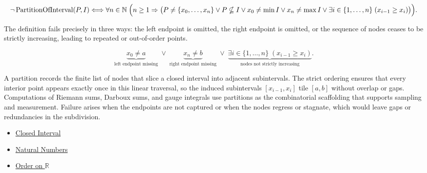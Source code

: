 \begin{remark*}
\[
\neg\operatorname{PartitionOfInterval}(P,I) \Longleftrightarrow
\forall n\in\mathbb{N}\;\Bigl(n\ge 1 \Rightarrow
\bigl(P\ne\{x_0,\ldots,x_n\}\lor P\nsubseteq I
\lor x_0\ne\min I \lor x_n\ne\max I
\lor \exists i\in\{1,\ldots,n\}\;(x_{i-1}\ge x_i)\bigr)\Bigr).
\]
\end{remark*}

\begin{remark*}
The definition fails precisely in three ways: the left endpoint is omitted, the right endpoint is omitted, or the sequence of nodes ceases to be strictly increasing, leading to repeated or out-of-order points.
\end{remark*}

\begin{remark*}
\[
\underbrace{x_0\ne a}_{\text{left endpoint missing}}
\;\lor\;
\underbrace{x_n\ne b}_{\text{right endpoint missing}}
\;\lor\;
\underbrace{\exists i\in\{1,\ldots,n\}\;(x_{i-1}\ge x_i)}_{\text{nodes not strictly increasing}}.
\]
\end{remark*}

\begin{remark*}[Interpretation]
A partition records the finite list of nodes that slice a closed interval into adjacent subintervals. The strict ordering ensures that every interior point appears exactly once in this linear traversal, so the induced subintervals $[x_{i-1},x_i]$ tile $[a,b]$ without overlap or gaps. Computations of Riemann sums, Darboux sums, and gauge integrals use partitions as the combinatorial scaffolding that supports sampling and measurement. Failure arises when the endpoints are not captured or when the nodes regress or stagnate, which would leave gaps or redundancies in the subdivision.
\end{remark*}

\begin{dependencies}
\begin{itemize}
  \item \hyperref[def:closed-interval]{Closed Interval}
  \item \hyperref[def:natural-numbers]{Natural Numbers}
  \item \hyperref[def:order-on-r]{Order on $\mathbb{R}$}
\end{itemize}
\end{dependencies}

